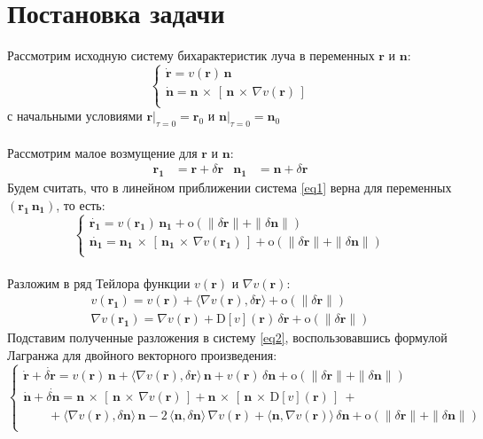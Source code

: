\documentclass{article}
\newcommand{\bfv}[1]{\mathbf{#1}}
\newcommand{\dd}[1]{\dot{#1}}
\newcommand{\dvp}[3]{#1\,\times\,[\,#2\,\times\,#3\,]}
\newcommand{\dv}[1]{\nabla v(#1)}
\newcommand{\ddv}[1]{\mathrm{D}[v](#1)}
\newcommand{\dr}{\delta \bfv{r}}
\newcommand{\dn}{\delta \bfv{n}}
\newcommand{\om}[1]{\mathrm{o}(#1)}
\newcommand{\dprod}[2]{\langle #1, #2 \rangle}
\begin{document}
\section{Постановка задачи}
Рассмотрим исходную систему бихарактеристик луча в переменных $\bfv{r}$ и $\bfv{n}$:
\begin{equation} \label{eq1}
\begin{cases}
\dd{\bfv{r}} = v(\bfv{r})\,\bfv{n}\\
\dd{\bfv{n}} = \dvp{\bfv{n}}{\bfv{n}}{\dv{\bfv{r}}}\\
\end{cases}
\end{equation}
с начальными условиями $\bfv{r}|_{\tau=0} = \bfv{r}_0$ и $\bfv{n}|_{\tau=0} = \bfv{n}_0$\\\\
Рассмотрим малое возмущение для $\bfv{r}$ и $\bfv{n}$:
\begin{align*}
\bfv{r_1} &= \bfv{r} + \dr   &   \bfv{n_1} &= \bfv{n} + \dr
\end{align*}
Будем считать, что в линейном приближении система \eqref{eq1} верна для переменных $(\bfv{r_1}\,\bfv{n_1})$, то есть: 
\begin{equation} \label{eq2}
\begin{cases}
\dd{\bfv{r_1}} = v(\bfv{r_1})\,\bfv{n_1} + \om{\|\dr\| + \|\dn\|}\\
\dd{\bfv{n_1}} = \dvp{\bfv{n_1}}{\bfv{n_1}}{\dv{\bfv{r_1}}} + \om{\|\dr\| + \|\dn\|}\\
\end{cases}
\end{equation}\\
Разложим в ряд Тейлора функции $v(\bfv{r})$ и $\dv{\bfv{r}}$:
\begin{gather*} 
v(\bfv{r_1}) = v(\bfv{r}) + \dprod{\dv{\bfv{r}}}{\dr} + \om{\|\dr\|}\\ 
\dv{\bfv{r_1}} = \dv{\bfv{r}} + \ddv{\bfv{r}}\,\dr + \om{\|\dr\|}
\end{gather*}
Подставим полученные разложения в систему \eqref{eq2}, воспользовавшись формулой Лагранжа для двойного векторного произведения: 
\begin{equation} \label{eq3}
\begin{cases}
\dd{\bfv{r}} + \dd{\dr} = v(\bfv{r})\,\bfv{n} + \dprod{\dv{\bfv{r}}}{\dr}\,\bfv{n} + v(\bfv{r})\,\dn + \om{\|\dr\| + \|\dn\|}\\
\dd{\bfv{n}} + \dd{\dn} = \dvp{\bfv{n}}{\bfv{n}}{\dv{\bfv{r}}} + \dvp{\bfv{n}}{\bfv{n}}{\ddv{\bfv{r}}} \ +\\
\qquad+ \dprod{\dv{\bfv{r}}}{\dn}\,\bfv{n} - 2\,\dprod{\bfv{n}}{\dn}\,\dv{\bfv{r}} + \dprod{\bfv{n}}{\dv{\bfv{r}}}\,\dn + \om{\|\dr\| + \|\dn\|}\\
\end{cases}
\end{equation}\\
\end{document}
